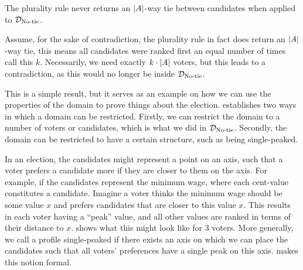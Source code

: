 \begin{proposition}
	The plurality rule never returns an $|A|$-way tie between candidates when applied to $\mathcal{D}_{\textnormal{No-tie}}$.
\end{proposition}

\begin{proofc} Assume, for the sake of contradiction, the plurality rule in
	fact does return an $|A|$-way tie, this means all
	candidates were ranked first an equal number of times call this $k$.
	Necessarily, we need exactly $k \cdot |A|$ voters, but this
	leads to a contradiction, as this would no longer be inside
	$\mathcal{D}_{\textnormal{No-tie}}$. \end{proofc}

This is a simple result, but it serves as an example on how we can use the
properties of the domain to prove things about the election.
\citet{gaertnerDomainRestrictions2002} establishes two ways in which a domain can
be restricted. Firstly, we can restrict the domain to a number of voters or
candidates, which is what we did in $\mathcal{D}_{\textnormal{No-tie}}$. Secondly, the domain can
be restricted to have a certain structure, such as being single-peaked.


In an election, the candidates might represent a point on an axis, such that a voter
prefers a candidate more if they are closer to them on the axis. For
example, if the candidates represent the minimum wage, where each cent-value
constitutes a candidate. Imagine a voter thinks the minimum wage should  be
some value $x$ and prefers candidates that are closer to this value $x$. This
results in each voter having a ``peak'' value, and all other values are ranked
in terms of their distance to $x$.  shows what this
might look like for 3 voters. More generally, we call a profile single-peaked
if there exists an axis on which we can place the candidates such that all
voters' preferences have a single peak on this axis. 
makes this notion formal.

